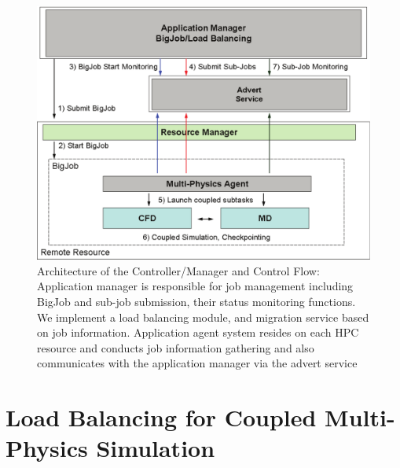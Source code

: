 \documentclass[conference,final]{IEEEtran}
\newcommand{\jhanote}[1]{ {\textcolor{red} { ***Jha: #1 }}}
\newcommand{\jhanote}[1]{}
\begin{document}
\begin{figure}
\centering
\includegraphics[scale=0.38]{Structure_of_BigJob}
\caption{\small Architecture of the Controller/Manager and Control
  Flow: Application manager is responsible for job management
  including BigJob and sub-job submission, their status monitoring
  functions. We implement a load balancing module, and migration
  service based on job information. Application agent system resides
  on each HPC resource and conducts job information gathering and also communicates with the application manager via the advert service}
\label{Fig:BigJob_Structure}
\end{figure}

\section{Load Balancing for Coupled Multi-Physics Simulation}


\end{document}

